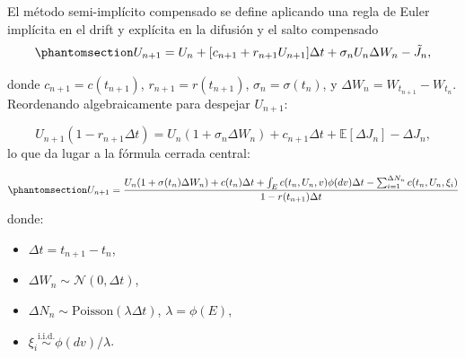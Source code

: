 \documentclass[
  spanish,
  us-letterpaper,
]{scrreprt}
\providecommand{\tightlist}{%
  \setlength{\itemsep}{0pt}\setlength{\parskip}{0pt}}
\theoremstyle{plain}
\theoremstyle{plain}
\theoremstyle{definition}
\theoremstyle{remark}
\begin{document}
El método semi-implícito compensado se define aplicando una regla de
Euler implícita en el drift y explícita en la difusión y el salto
compensado
\begin{equation}\protect\phantomsection\label{eq-esquema_semiimplicito}{U_{n+1} = U_n + [c_{n+1} + r_{n+1}U_{n+1}]\Delta t + \sigma_n U_n \Delta W_n - \tilde{J}_n,}\end{equation}

donde \(c_{n+1} = c(t_{n+1})\), \(r_{n+1} = r(t_{n+1})\),
\(\sigma_n = \sigma(t_n)\), y \(\Delta W_n = W_{t_{n+1}} - W_{t_n}\).
Reordenando algebraicamente para despejar \(U_{n+1}\):

\[U_{n+1}(1 - r_{n+1}\Delta t) = U_n(1 + \sigma_n \Delta W_n) + c_{n+1}\Delta t + \mathbb{E}[\Delta J_n] - \Delta J_n,\]
lo que da lugar a la fórmula cerrada central:

\begin{equation}\protect\phantomsection\label{eq-esquema_semiimplicito_despeje}{U_{n+1} = 
\frac{U_n (1 + \sigma(t_n) \Delta W_n ) + c(t_n)\Delta t + \int_E c(t_n, U_n, v) \phi(dv) \Delta t - \sum_{i=1}^{\Delta N_n} c(t_n, U_n, \xi_i)
}{1 - r(t_{n+1}) \Delta t}}\end{equation} donde:

\begin{itemize}
\tightlist
\item
  \(\Delta t = t_{n+1} - t_n\),
\item
  \(\Delta W_n \sim \mathcal{N}(0, \Delta t)\),
\item
  \(\Delta N_n \sim \text{Poisson}(\lambda \Delta t)\),
  \(\lambda = \phi(E)\),
\item
  \(\xi_i \stackrel{\text{i.i.d.}}{\sim} \phi(dv)/\lambda\).
\end{itemize}
\end{document}
